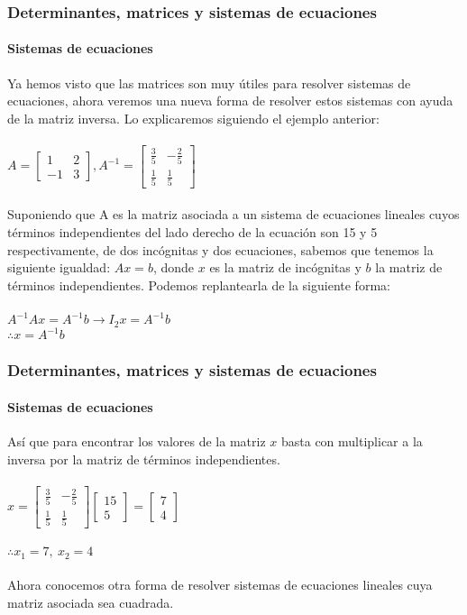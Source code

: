 \documentclass[11pt]{beamer}
\begin{document}
\begin{frame}
\frametitle{Determinantes, matrices y sistemas de ecuaciones}
\framesubtitle{Sistemas de ecuaciones}
Ya hemos visto que las matrices son muy útiles para resolver sistemas de ecuaciones, ahora veremos una nueva forma de resolver estos sistemas con ayuda de la matriz inversa.
Lo explicaremos siguiendo el ejemplo anterior: \\ \hspace{0cm} \\
${\displaystyle A = {\begin{bmatrix}1&2\\-1&3\end{bmatrix}}}, 
\displaystyle A^{-1} = {\begin{bmatrix}\frac{3}{5}&-\frac{2}{5}\\\frac{1}{5}&\frac{1}{5}\end{bmatrix}}$\\ \hspace{0cm} \\
Suponiendo que A es la matriz asociada a un sistema de ecuaciones lineales cuyos términos independientes del lado derecho de la ecuación son 15 y 5 respectivamente, de dos incógnitas y dos ecuaciones, sabemos que tenemos la siguiente igualdad: $Ax=b$, donde $x$ es la matriz de incógnitas y $b$ la matriz de términos independientes. Podemos replantearla de la siguiente forma: \\ \hspace{0cm} \\
$A^{-1}Ax = A^{-1}b \rightarrow I_2x = A^{-1}b$\\
$\therefore x = A^{-1}b$
\end{frame}

\begin{frame}
\frametitle{Determinantes, matrices y sistemas de ecuaciones}
\framesubtitle{Sistemas de ecuaciones}
Así que para encontrar los valores de la matriz $x$ basta con multiplicar a la inversa por la matriz de términos independientes. 
\\ \hspace{0cm} \\
$x = \displaystyle {\begin{bmatrix}\frac{3}{5}&-\frac{2}{5}\\\frac{1}{5}&\frac{1}{5}\end{bmatrix}} 
\displaystyle {\begin{bmatrix}15\\5\end{bmatrix}} = {\begin{bmatrix}7\\4\end{bmatrix}}$\\ \hspace{0cm} \\
$\therefore x_1 = 7, ~ x_2 = 4$ \\ \hspace{0cm} \\
Ahora conocemos otra forma de resolver sistemas de ecuaciones lineales cuya matriz asociada sea cuadrada.
\end{frame}
\end{document}
